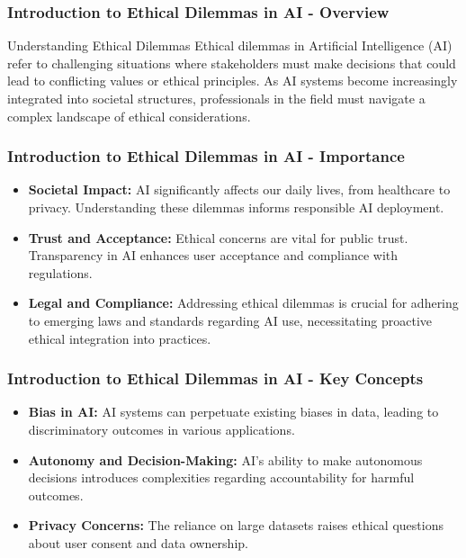 \documentclass[aspectratio=169]{beamer}
\begin{document}
\frame{\titlepage}

\begin{frame}[fragile]
    \frametitle{Introduction to Ethical Dilemmas in AI - Overview}
    \begin{block}{Understanding Ethical Dilemmas}
        Ethical dilemmas in Artificial Intelligence (AI) refer to challenging situations where stakeholders must make decisions that could lead to conflicting values or ethical principles. As AI systems become increasingly integrated into societal structures, professionals in the field must navigate a complex landscape of ethical considerations.
    \end{block}
\end{frame}

\begin{frame}[fragile]
    \frametitle{Introduction to Ethical Dilemmas in AI - Importance}
    \begin{itemize}
        \item \textbf{Societal Impact:} 
        AI significantly affects our daily lives, from healthcare to privacy. Understanding these dilemmas informs responsible AI deployment.
        
        \item \textbf{Trust and Acceptance:} 
        Ethical concerns are vital for public trust. Transparency in AI enhances user acceptance and compliance with regulations.
        
        \item \textbf{Legal and Compliance:} 
        Addressing ethical dilemmas is crucial for adhering to emerging laws and standards regarding AI use, necessitating proactive ethical integration into practices.
    \end{itemize}
\end{frame}

\begin{frame}[fragile]
    \frametitle{Introduction to Ethical Dilemmas in AI - Key Concepts}
    \begin{itemize}
        \item \textbf{Bias in AI:} 
        AI systems can perpetuate existing biases in data, leading to discriminatory outcomes in various applications.
        
        \item \textbf{Autonomy and Decision-Making:} 
        AI’s ability to make autonomous decisions introduces complexities regarding accountability for harmful outcomes.

        \item \textbf{Privacy Concerns:} 
        The reliance on large datasets raises ethical questions about user consent and data ownership.
    \end{itemize}
\end{frame}
\end{document}
